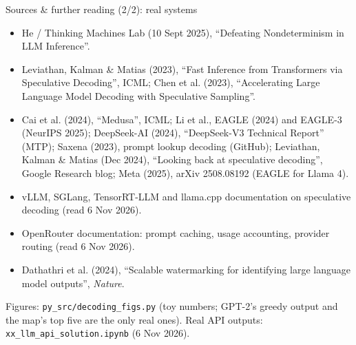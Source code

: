 \documentclass[aspectratio=169]{beamer}
\newcommand{\src}[1]{{\scriptsize\color{gray} #1}}
\begin{document}
\begin{frame}{Sources \& further reading (2/2): real systems}
  \scriptsize
  \begin{itemize}
    \item He / Thinking Machines Lab (10 Sept 2025), ``Defeating Nondeterminism in LLM
      Inference''.
    \item Leviathan, Kalman \& Matias (2023), ``Fast Inference from Transformers via Speculative
      Decoding'', ICML; Chen et al. (2023), ``Accelerating Large Language Model Decoding with
      Speculative Sampling''.
    \item Cai et al. (2024), ``Medusa'', ICML; Li et al., EAGLE (2024) and EAGLE-3 (NeurIPS 2025);
      DeepSeek-AI (2024), ``DeepSeek-V3 Technical Report'' (MTP); Saxena (2023), prompt lookup
      decoding (GitHub); Leviathan, Kalman \& Matias (Dec 2024), ``Looking back at speculative
      decoding'', Google Research blog; Meta (2025), arXiv 2508.08192 (EAGLE for Llama 4).
    \item vLLM, SGLang, TensorRT-LLM and llama.cpp documentation on speculative decoding (read 6 Nov
      2026).
    \item OpenRouter documentation: prompt caching, usage accounting, provider routing (read 6 Nov
      2026).
    \item Dathathri et al. (2024), ``Scalable watermarking for identifying large language model
      outputs'', \emph{Nature}.
  \end{itemize}
  \vskip 2pt
  \src{Figures: \texttt{py\_src/decoding\_figs.py} (toy numbers; GPT-2's greedy output and the
  map's top five are the only real ones). Real API outputs: \texttt{xx\_llm\_api\_solution.ipynb}
  (6 Nov 2026).}
\end{frame}
\end{document}
